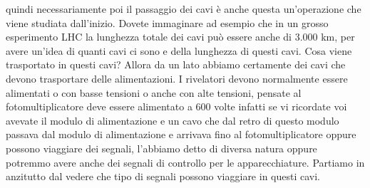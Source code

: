 quindi necessariamente poi il passaggio dei cavi è anche questa un'operazione che viene studiata dall'inizio. Dovete immaginare ad esempio che in un grosso esperimento LHC la lunghezza totale dei cavi può essere anche di 3.000 km, per avere un'idea di quanti cavi ci sono e della lunghezza di questi cavi. Cosa viene trasportato in questi cavi? Allora da un lato abbiamo certamente dei cavi che devono trasportare delle alimentazioni. I rivelatori devono normalmente essere alimentati o con basse tensioni o anche con alte tensioni, pensate al fotomultiplicatore deve essere alimentato a 600 volte infatti se vi ricordate voi avevate il modulo di alimentazione e un cavo che dal retro di questo modulo passava dal modulo di alimentazione e arrivava fino al fotomultiplicatore oppure possono viaggiare dei segnali, l'abbiamo detto di diversa natura oppure potremmo avere anche dei segnali di controllo per le apparecchiature. Partiamo in anzitutto dal vedere che tipo di segnali possono viaggiare in questi cavi. 

